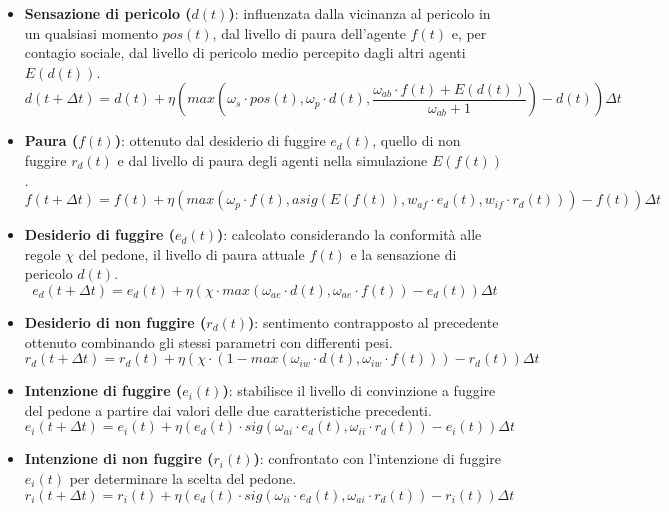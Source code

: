 \begin{itemize}
    \item \textbf{Sensazione di pericolo ($d(t)$)}: influenzata dalla vicinanza al pericolo in un qualsiasi momento $pos(t)$, dal livello di paura dell'agente $f(t)$ e, per contagio sociale, dal livello di pericolo medio percepito dagli altri agenti $E(d(t))$.
    \begin{equation*}
        d(t + \Delta t) = d(t) + \eta(max(\omega_{s} \cdot pos(t), \omega_{p} \cdot d(t), \frac{\omega_{ab} \cdot f(t) + E(d(t))}{\omega_{ab} + 1}) - d(t))\Delta t
    \end{equation*}
    
    \item \textbf{Paura ($f(t)$)}: ottenuto dal desiderio di fuggire $e_{d}(t)$, quello di non fuggire $r_{d}(t)$ e dal livello di paura degli agenti nella simulazione $E(f(t))$.
    \begin{equation*}
        f(t + \Delta t) = f(t) + \eta(max(\omega_{p} \cdot f(t), asig(E(f(t)), w_{af} \cdot e_{d}(t), w_{if} \cdot r_{d}(t))) - f(t))\Delta t
    \end{equation*}
    
    \item \textbf{Desiderio di fuggire ($e_{d}(t)$)}: calcolato considerando la conformità alle regole $\chi$ del pedone, il livello di paura attuale $f(t)$ e la sensazione di pericolo $d(t)$.
    \begin{equation*}
        e_{d}(t + \Delta t) = e_{d}(t) + \eta(\chi \cdot max(\omega_{ae} \cdot d(t), \omega_{ae} \cdot f(t)) - e_{d}(t))\Delta t
    \end{equation*}
 
    \item \textbf{Desiderio di non fuggire ($r_{d}(t)$)}: sentimento contrapposto al precedente ottenuto combinando gli stessi parametri con differenti pesi.
    \begin{equation*}
        r_{d}(t + \Delta t) = r_{d}(t) + \eta(\chi \cdot (1 - max(\omega_{iw} \cdot d(t), \omega_{iw} \cdot f(t))) - r_{d}(t))\Delta t
    \end{equation*}

    \item \textbf{Intenzione di fuggire ($e_{i}(t)$)}: stabilisce il livello di convinzione a fuggire del pedone a partire dai valori delle due caratteristiche precedenti. 
    \begin{equation*}
        e_{i}(t + \Delta t) = e_{i}(t) + \eta(e_{d}(t) \cdot sig(\omega_{ai} \cdot e_{d}(t), \omega_{ii} \cdot r_{d}(t)) - e_{i}(t))\Delta t
    \end{equation*}
    
    \item \textbf{Intenzione di non fuggire ($r_{i}(t)$)}: confrontato con l'intenzione di fuggire $e_{i}(t)$ per determinare la scelta del pedone.
    \begin{equation*}
        r_{i}(t + \Delta t) = r_{i}(t) + \eta(e_{d}(t) \cdot sig(\omega_{ii} \cdot e_{d}(t), \omega_{ai} \cdot r_{d}(t)) - r_{i}(t))\Delta t
    \end{equation*}
\end{itemize}

